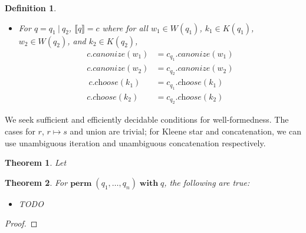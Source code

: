 \documentclass[a4paper,11pt] {article}
\theoremstyle{plain}
\newtheorem*{theorem*}{Theorem}
\newtheorem{definition}[theorem]{Definition}
\newcommand{\lcanonize}[1]{\textit{$#1$.canonize}}
\newcommand{\lchoose}[1]{\textit{$#1$.choose}}
\newcommand{\perm}{ \textbf{perm}\; }
\newcommand{\with}{ \;\textbf{with}\; }
\begin{document}
\begin{definition}
\begin{itemize}
  \item For $q = q_1 ~|~ q_2$, $\llbracket q \rrbracket = c$ where
    for all $w_1 \in W(q_1)$, $k_1 \in K(q_1)$, $w_2 \in W(q_2)$,
    and $k_2 \in K(q_2)$,
    \begin{align*}
      \lcanonize{c}(w_1) &=
      \lcanonize{c_{q_1}}(w_1) \\
      \lcanonize{c}(w_2) &=
      \lcanonize{c_{q_2}}(w_2) \\
      \
      \lchoose{c}(k_1) &=
      \lchoose{c_{q_1}}(k_1) \\      
      \lchoose{c}(k_2) &=
      \lchoose{c_{q_2}}(k_2)
    \end{align*}
  \end{itemize}  
\end{definition}
We seek sufficient and efficiently decidable conditions for
well-formedness. The cases for $r$, $r \mapsto s$ and union are trivial;
for Kleene star and concatenation, we can use unambiguous iteration
and unambiguous concatenation respectively. 

\begin{theorem*}
Let 
\end{theorem*}


\begin{theorem*}
  For $\perm(q_1,\ldots, q_n) \with q$, the following are true:
  \begin{itemize}
  \item TODO
  \end{itemize}
\end{theorem*}
\begin{proof}

  

\end{proof}
\end{document}
